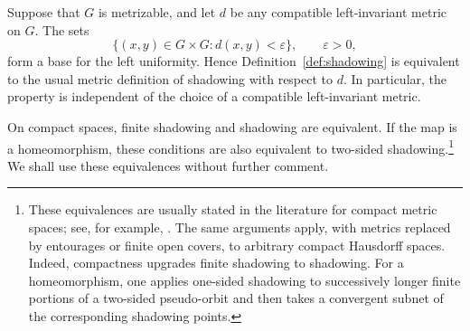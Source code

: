 \documentclass[12pt]{amsart}
\theoremstyle{definition}
\numberwithin{equation}{section}
\theoremstyle{remark}
\begin{document}
Suppose that $G$ is metrizable, and let $d$ be any compatible
left-invariant metric on $G$. The sets
\[
\{(x,y)\in G\times G:d(x,y)<\varepsilon\},
\qquad \varepsilon>0,
\]
form a base for the left uniformity. Hence
Definition~\ref{def:shadowing} is equivalent to the usual metric
definition of shadowing with respect to $d$. In particular, the
property is independent of the choice of a compatible left-invariant
metric.


On compact spaces, finite shadowing and shadowing are equivalent. If
the map is a homeomorphism, these conditions are also equivalent to
two-sided shadowing.\footnote{These equivalences are usually stated
in the literature for compact metric spaces; see, for example,
\cite{AH,GOP,Pilyugin}. The same arguments apply, with metrics
replaced by entourages or finite open covers, to arbitrary compact
Hausdorff spaces. Indeed, compactness upgrades finite shadowing to
shadowing. For a homeomorphism, one applies one-sided shadowing to
successively longer finite portions of a two-sided pseudo-orbit and
then takes a convergent subnet of the corresponding shadowing
points.}
We shall use these equivalences without further comment.
\end{document}
